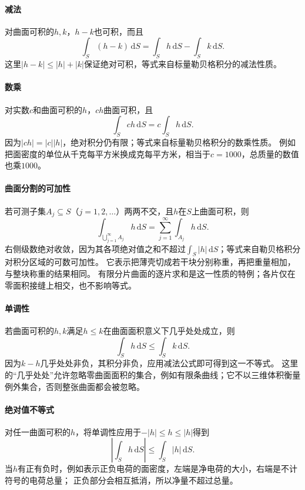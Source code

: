 \paragraph{减法}

对曲面可积的$h,k$，$h-k$也可积，而且
\[
 \int_S(h-k)\,\mathrm dS=\int_Sh\,\mathrm dS-\int_Sk\,\mathrm dS.
\]
这里$|h-k|\leq|h|+|k|$保证绝对可积，等式来自标量勒贝格积分的减法性质。

\paragraph{数乘}

对实数$c$和曲面可积的$h$，$ch$曲面可积，且
\[
 \int_Sch\,\mathrm dS=c\int_Sh\,\mathrm dS.
\]
因为$|ch|=|c||h|$，绝对积分仍有限；等式来自标量勒贝格积分的数乘性质。
例如把面密度的单位从千克每平方米换成克每平方米，相当于$c=1000$，总质量的数值也乘$1000$。

\paragraph{曲面分割的可加性}

若可测子集$A_j\subseteq S$（$j=1,2,\ldots$）两两不交，且$h$在$S$上曲面可积，则
\[
 \int_{\bigcup_{j=1}^\infty A_j}h\,\mathrm dS
 =\sum_{j=1}^\infty\int_{A_j}h\,\mathrm dS.
\]
右侧级数绝对收敛，因为其各项绝对值之和不超过$\int_S|h|\,\mathrm dS$；等式来自勒贝格积分对积分区域的可数可加性。
它表示把薄壳切成若干块分别称重，再把重量相加，与整块称重的结果相同。
有限分片曲面的逐片求和是这一性质的特例；各片仅在零面积接缝上相交，也不影响等式。

\paragraph{单调性}

若曲面可积的$h,k$满足$h\leq k$在曲面面积意义下几乎处处成立，则
\[
 \int_Sh\,\mathrm dS\leq\int_Sk\,\mathrm dS.
\]
因为$k-h$几乎处处非负，其积分非负，应用减法公式即可得到这一不等式。
这里的“几乎处处”允许忽略零曲面面积的集合，例如有限条曲线；它不以三维体积衡量例外集合，否则整张曲面都会被忽略。

\paragraph{绝对值不等式}

对任一曲面可积的$h$，将单调性应用于$-|h|\leq h\leq|h|$得到
\[
 \left|\int_Sh\,\mathrm dS\right|\leq\int_S|h|\,\mathrm dS.
\]
当$h$有正有负时，例如表示正负电荷的面密度，左端是净电荷的大小，右端是不计符号的电荷总量；
正负部分会相互抵消，所以净量不超过总量。

